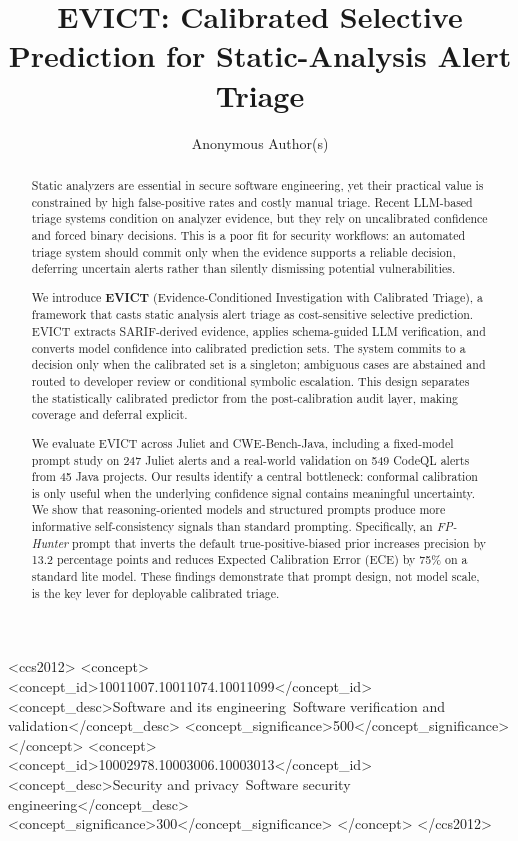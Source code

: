 \documentclass[sigconf,review,anonymous]{acmart}
\title{EVICT: Calibrated Selective Prediction for Static-Analysis Alert Triage}
\author{Anonymous Author(s)}
\affiliation{%
  \institution{Anonymous Institution}
  \country{Anonymous Country}}
\begin{document}
\begin{abstract}
Static analyzers are essential in secure software engineering, yet their practical value is constrained by high false-positive rates and costly manual triage. Recent LLM-based triage systems condition on analyzer evidence, but they rely on uncalibrated confidence and forced binary decisions. This is a poor fit for security workflows: an automated triage system should commit only when the evidence supports a reliable decision, deferring uncertain alerts rather than silently dismissing potential vulnerabilities.

We introduce \textbf{EVICT} (Evidence-Conditioned Investigation with Calibrated Triage), a framework that casts static analysis alert triage as cost-sensitive selective prediction. EVICT extracts SARIF-derived evidence, applies schema-guided LLM verification, and converts model confidence into calibrated prediction sets. The system commits to a decision only when the calibrated set is a singleton; ambiguous cases are abstained and routed to developer review or conditional symbolic escalation. This design separates the statistically calibrated predictor from the post-calibration audit layer, making coverage and deferral explicit.

We evaluate EVICT across Juliet and CWE-Bench-Java, including a fixed-model prompt study on 247 Juliet alerts and a real-world validation on 549 CodeQL alerts from 45 Java projects. Our results identify a central bottleneck: conformal calibration is only useful when the underlying confidence signal contains meaningful uncertainty. We show that reasoning-oriented models and structured prompts produce more informative self-consistency signals than standard prompting. Specifically, an \emph{FP-Hunter} prompt that inverts the default true-positive-biased prior increases precision by 13.2 percentage points and reduces Expected Calibration Error (ECE) by 75\% on a standard lite model. These findings demonstrate that prompt design, not model scale, is the key lever for deployable calibrated triage.
\end{abstract}

\begin{CCSXML}
<ccs2012>
 <concept>
  <concept_id>10011007.10011074.10011099</concept_id>
  <concept_desc>Software and its engineering~Software verification and validation</concept_desc>
  <concept_significance>500</concept_significance>
 </concept>
 <concept>
  <concept_id>10002978.10003006.10003013</concept_id>
  <concept_desc>Security and privacy~Software security engineering</concept_desc>
  <concept_significance>300</concept_significance>
 </concept>
</ccs2012>
\end{CCSXML}
\end{document}
